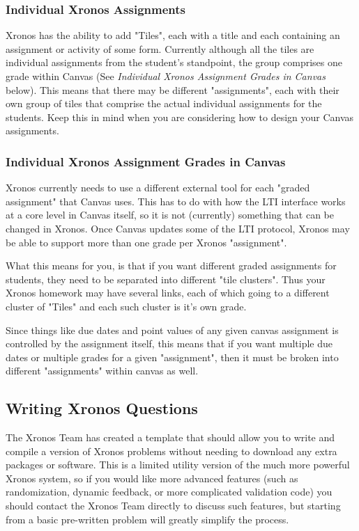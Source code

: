\documentclass{article}
\begin{document}
\subsubsection{Individual Xronos Assignments}
Xronos has the ability to add "Tiles", each with a title and each containing an assignment or activity of some form. Currently although all the tiles are individual assignments from the student's standpoint, the group comprises one grade within Canvas (See \textit{Individual Xronos Assignment Grades in Canvas} below). This means that there may be different "assignments", each with their own group of tiles that comprise the actual individual assignments for the students. Keep this in mind when you are considering how to design your Canvas assignments.


\subsubsection{Individual Xronos Assignment Grades in Canvas}
Xronos currently needs to use a different external tool for each "graded assignment" that Canvas uses. This has to do with how the LTI interface works at a core level in Canvas itself, so it is not (currently) something that can be changed in Xronos. Once Canvas updates some of the LTI protocol, Xronos may be able to support more than one grade per Xronos "assignment".

What this means for you, is that if you want different graded assignments for students, they need to be separated into different "tile clusters". Thus your Xronos homework may have several links, each of which going to a different cluster of "Tiles" and each such cluster is it's own grade. 

Since things like due dates and point values of any given canvas assignment is controlled by the assignment itself, this means that if you want multiple due dates or multiple grades for a given "assignment", then it must be broken into different "assignments" within canvas as well. 


\subsection{Writing Xronos Questions}
The Xronos Team has created a template that should allow you to write and compile a version of Xronos problems without needing to download any extra packages or software. This is a limited utility version of the much more powerful Xronos system, so if you would like more advanced features (such as randomization, dynamic feedback, or more complicated validation code) you should contact the Xronos Team directly to discuss such features, but starting from a basic pre-written problem will greatly simplify the process.
\end{document}
